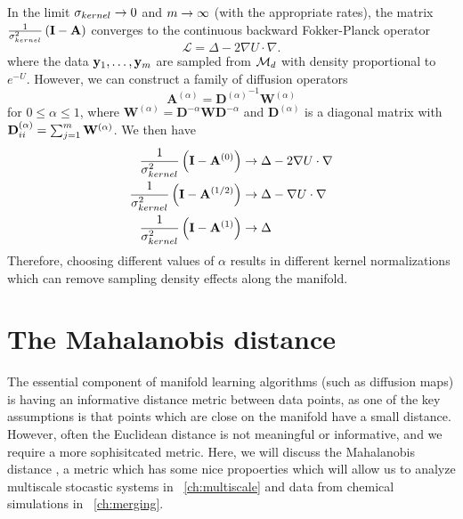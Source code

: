 In the limit $\sigma_{kernel} \rightarrow 0$ and $m \rightarrow \infty$ (with the appropriate rates), the matrix $\frac{1}{\sigma_{kernel}^2} \left( \mathbf{I} - \mathbf{A} \right) $ converges to the continuous backward Fokker-Planck operator \cite{nadler2006diffusion}
\begin{equation}
	\mathcal{L} = \Delta - 2 \nabla U \cdot \nabla.
	\label{eq:limiting_operator}
\end{equation}
where the data $\mathbf{y}_1, \dots , \mathbf{y}_m$ are sampled from $\mathcal{M}_d$ with density proportional to $e^{-U}$. 
%
However, we can construct a family of diffusion operators 
\begin{equation} \label{eq:kernel2}
\mathbf{A}^{(\alpha)} = {\mathbf{D}^{(\alpha)}}^{-1} \mathbf{W}^{(\alpha)}
\end{equation}
for $0 \le \alpha \le 1$, where $\mathbf{W}^{(\alpha)} = \mathbf{D}^{-\alpha} \mathbf{W} \mathbf{D}^{-\alpha}$ 
and $\mathbf{D}^{(\alpha)}$ is a diagonal matrix with $\mathbf{D}^{(\alpha)}_{ii} = \sum_{j=1}^m \mathbf{W}^{(\alpha)}$.
%
We then have \cite{coifman2005geometric}
\begin{equation}
\begin{aligned}
\frac{1}{\sigma_{kernel}^2} \left( \mathbf{I} - \mathbf{A}^{(0)} \right) & \rightarrow \Delta - 2 \nabla U \cdot \nabla \\
\frac{1}{\sigma_{kernel}^2} \left( \mathbf{I} - \mathbf{A}^{(1/2)} \right) & \rightarrow \Delta - \nabla U \cdot \nabla \\
\frac{1}{\sigma_{kernel}^2} \left( \mathbf{I} - \mathbf{A}^{(1)} \right) & \rightarrow \Delta  
\end{aligned}
\end{equation}
%
Therefore, choosing different values of $\alpha$ results in different kernel normalizations which can remove sampling density effects along the manifold. 


\section{The Mahalanobis distance}
\label{subsec:mahalanobis}

The essential component of manifold learning algorithms (such as diffusion maps) is having an informative distance metric between data points, as one of the key assumptions is that points which are close on the manifold have a small distance. 
%
However, often the Euclidean distance is not meaningful or informative, and we require a more sophisitcated metric. 
%
Here, we will discuss the Mahalanobis distance \cite{mahalanobis1936generalized}, a metric which has some nice propoerties which will allow us to analyze multiscale stocastic systems in \chap~\ref{ch:multiscale} and data from chemical simulations in \chap~\ref{ch:merging}. 

